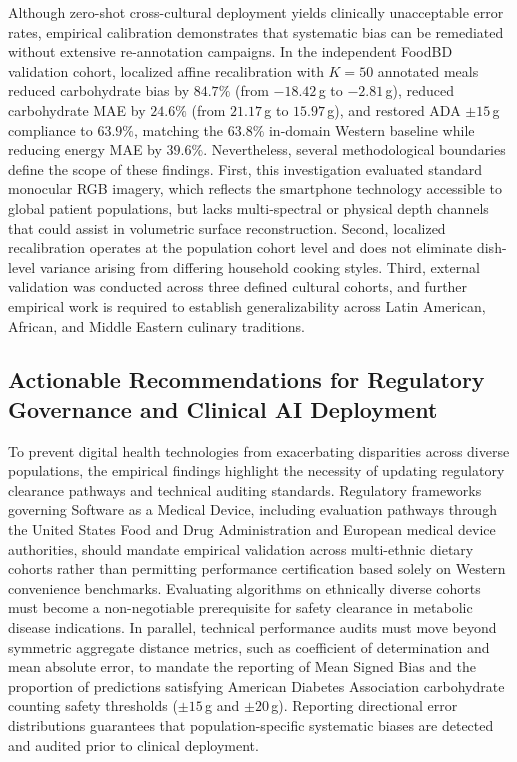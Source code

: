 \documentclass[utf8]{FrontiersinVancouver}
\begin{document}
Although zero-shot cross-cultural deployment yields clinically unacceptable error rates, empirical calibration demonstrates that systematic bias can be remediated without extensive re-annotation campaigns. In the independent FoodBD validation cohort, localized affine recalibration with $K=50$ annotated meals reduced carbohydrate bias by $84.7\%$ (from $-18.42$\,g to $-2.81$\,g), reduced carbohydrate MAE by $24.6\%$ (from $21.17$\,g to $15.97$\,g), and restored ADA $\pm 15$\,g compliance to $63.9\%$, matching the $63.8\%$ in-domain Western baseline while reducing energy MAE by $39.6\%$. Nevertheless, several methodological boundaries define the scope of these findings. First, this investigation evaluated standard monocular RGB imagery, which reflects the smartphone technology accessible to global patient populations, but lacks multi-spectral or physical depth channels that could assist in volumetric surface reconstruction. Second, localized recalibration operates at the population cohort level and does not eliminate dish-level variance arising from differing household cooking styles. Third, external validation was conducted across three defined cultural cohorts, and further empirical work is required to establish generalizability across Latin American, African, and Middle Eastern culinary traditions.

\subsection{Actionable Recommendations for Regulatory Governance and Clinical AI Deployment}

To prevent digital health technologies from exacerbating disparities across diverse populations, the empirical findings highlight the necessity of updating regulatory clearance pathways and technical auditing standards. Regulatory frameworks governing Software as a Medical Device, including evaluation pathways through the United States Food and Drug Administration and European medical device authorities, should mandate empirical validation across multi-ethnic dietary cohorts rather than permitting performance certification based solely on Western convenience benchmarks. Evaluating algorithms on ethnically diverse cohorts must become a non-negotiable prerequisite for safety clearance in metabolic disease indications. In parallel, technical performance audits must move beyond symmetric aggregate distance metrics, such as coefficient of determination and mean absolute error, to mandate the reporting of Mean Signed Bias and the proportion of predictions satisfying American Diabetes Association carbohydrate counting safety thresholds ($\pm 15$\,g and $\pm 20$\,g). Reporting directional error distributions guarantees that population-specific systematic biases are detected and audited prior to clinical deployment.
\end{document}
